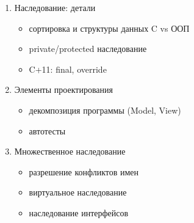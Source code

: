 \begin{enumerate}[noitemsep]
\item{Наследование: детали}
\begin{itemize}[noitemsep]
    \item сортировка и структуры данных C vs ООП
    \item private/protected наследование
    \item C+11: final, override
\end{itemize}
\item{Элементы проектирования}
\begin{itemize}[noitemsep]
    \item декомпозиция программы (Model, View)
    \item автотесты
\end{itemize}
\item{Множественное наследование}
\begin{itemize}[noitemsep]
    \item разрешение конфликтов имен
    \item виртуальное наследование
    \item наследование интерфейсов
\end{itemize}
\end{enumerate}
% 
